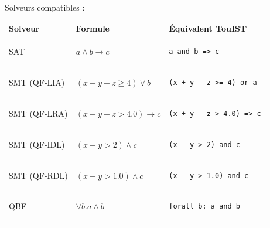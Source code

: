 \documentclass[english,french,usenames,dvipsnames]{beamer}
\begin{document}
\begin{frame}[containsverbatim]{\subsecname}
Solveurs compatibles :
\begin{table}
    \centering
    \begin{tabular}{l|l|l}
        \textbf{Solveur} & \textbf{Formule} & \textbf{Équivalent TouIST} \\[5pt]
SAT
&
$a \wedge b \rightarrow c$
&
\begin{minipage}{4cm}\begin{verbatim}
a and b => c
\end{verbatim}\end{minipage}
\\[5pt]

SMT {\scriptsize{}(QF-LIA)}
&
$(x + y - z \ge 4) \vee b$
&
\begin{minipage}{4cm}\begin{verbatim}
(x + y - z >= 4) or a
\end{verbatim}\end{minipage}
\\

SMT {\scriptsize{}(QF-LRA)}
&
$(x + y - z > 4.0) \rightarrow c$
&
\begin{minipage}{5cm}\begin{verbatim}
(x + y - z > 4.0) => c
\end{verbatim}\end{minipage}
\\

SMT {\scriptsize{}(QF-IDL)}
&
$(x - y > 2) \wedge c$
&
\begin{minipage}{5cm}\begin{verbatim}
(x - y > 2) and c
\end{verbatim}\end{minipage}
\\

SMT {\scriptsize{}(QF-RDL)}
&
$(x - y > 1.0) \wedge c$
&
\begin{minipage}{5cm}\begin{verbatim}
(x - y > 1.0) and c
\end{verbatim}\end{minipage}
\\[5pt]

QBF
&
$\forall b.  a \wedge b$
&
\begin{minipage}{5cm}\begin{verbatim}
forall b: a and b
\end{verbatim}\end{minipage}


\end{tabular}
\end{table}
\end{frame}
\end{document}
